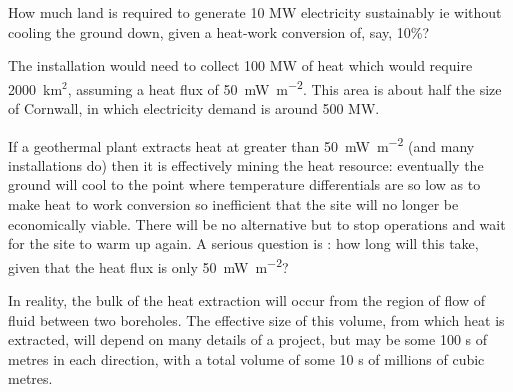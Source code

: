 \documentclass[a4paper,12pt,fleqn]{article}
\begin{document}
\begin{Exercise}[label=ex1]
How much land is required to generate 10 MW electricity sustainably ie without cooling the ground down, given a heat-work conversion of, say, 10\%?
\end{Exercise}
\begin{Answer}[ref=ex1]
The installation would need to collect 100 MW of heat which would require 2000~km$^2$, assuming a heat flux of \SI{50}{\milli\watt\per\metre\squared}. This area is about half the size of Cornwall, in which electricity demand is around 500 MW.
\end{Answer}

If a geothermal plant extracts heat at greater than \SI{50}{\milli\watt\per\metre\squared} (and many installations do) then it is effectively mining the heat resource: eventually the ground will cool to the point where temperature differentials are so low as to make heat to work conversion so inefficient that the site will no longer be economically viable. There will be no alternative but to stop operations and wait for the site to warm up again. A serious question is : how long will this take, given that the heat flux is only \SI{50}{\milli\watt\per\metre\squared}?

In reality, the bulk of the heat extraction will occur from the region of flow of fluid between two boreholes. The effective size of this volume, from which heat is extracted, will depend on many details of a project, but may be some 100 s of metres in each direction, with a total volume of some 10 s of millions of cubic metres.
\end{document}
